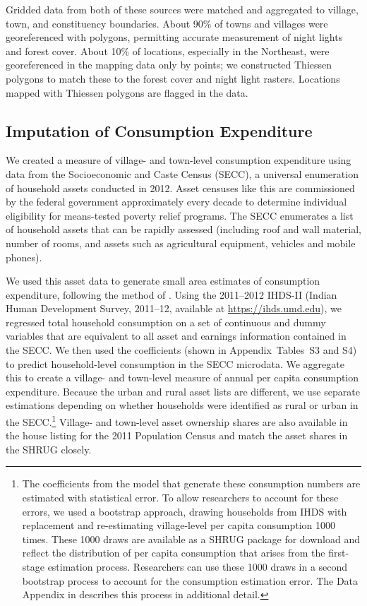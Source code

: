 \documentclass[12pt,letterpaper]{article}
\begin{document}
Gridded data from both of these sources were matched and aggregated to
village, town, and constituency boundaries. About 90\% of towns and
villages were georeferenced with polygons, permitting accurate
measurement of night lights and forest cover. About 10\% of locations,
especially in the Northeast, were georeferenced in the mapping data
only by points; we constructed Thiessen polygons to match these to the
forest cover and night light rasters. Locations mapped with Thiessen
polygons are flagged in the data.

\subsection*{Imputation of Consumption Expenditure}
\label{sec:data_cons}

We created a measure of village- and town-level consumption expenditure using data from the Socioeconomic and Caste Census (SECC), a universal enumeration of household assets conducted in 2012. Asset censuses like this are commissioned by the federal government approximately every decade to determine individual eligibility for means-tested poverty relief programs. The SECC enumerates a list of household assets that can be rapidly assessed (including roof and wall material, number of rooms, and assets such as agricultural equipment, vehicles and mobile phones).

We used this asset data to generate small area estimates of
consumption expenditure, following the method of
. Using the 2011--2012 IHDS-II (Indian Human
Development Survey, 2011--12, available at
\url{https://ihds.umd.edu}), we regressed total household consumption
on a set of continuous and dummy variables that are equivalent to all
asset and earnings information contained in the SECC. We then used the
coefficients (shown in Appendix~Tables~S3 and S4) to predict household-level consumption in
the SECC microdata. We aggregate this to create a village- and
town-level measure of annual per capita consumption
expenditure. Because the urban and rural asset lists are different, we
use separate estimations depending on whether households were
identified as rural or urban in the SECC.\footnote{The coefficients
  from the model that generate these consumption numbers are estimated
  with statistical error. To allow researchers to account for these
  errors, we used a bootstrap approach, drawing households from IHDS
  with replacement and re-estimating village-level per capita
  consumption 1000 times. These 1000 draws are available as a SHRUG
  package for download and reflect the distribution of per capita
  consumption that arises from the first-stage estimation
  process. Researchers can use these 1000 draws in a second bootstrap
  process to account for the consumption estimation error. The Data
  Appendix in  describes this process in
  additional detail.} Village- and town-level asset ownership shares
are also available in the house listing for the 2011 Population Census
and match the asset shares in the SHRUG closely.
\end{document}
